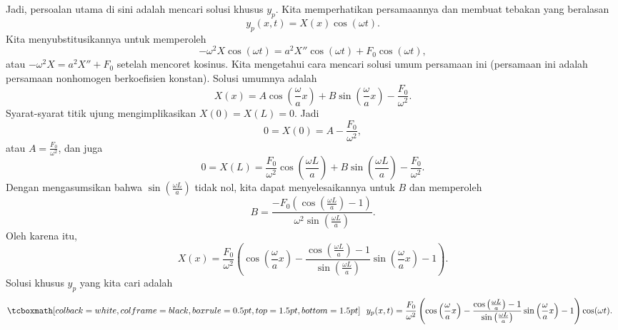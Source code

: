 Jadi, persoalan utama di sini adalah mencari solusi khusus $y_p$.
Kita memperhatikan persamaannya dan membuat tebakan yang beralasan
\begin{equation*}
y_p(x,t) = X(x) \cos (\omega t) .
\end{equation*}
Kita menyubstitusikannya untuk memperoleh
\begin{equation*}
-\omega^2 X \cos ( \omega t) = a^2 X'' \cos ( \omega t) +
F_0 \cos ( \omega t ) ,
\end{equation*}
atau
$-\omega^2 X = a^2 X'' + F_0$ setelah mencoret kosinus.
Kita mengetahui cara mencari solusi umum persamaan ini (persamaan ini adalah
persamaan nonhomogen berkoefisien konstan).
Solusi umumnya adalah
\begin{equation*}
X(x) = A \cos \left( \frac{\omega}{a} x \right)
+ B \sin \left( \frac{\omega}{a} x \right) -
\frac{F_0}{\omega^2} .
\end{equation*}
Syarat-syarat titik ujung mengimplikasikan $X(0) = X(L) = 0$.  Jadi
\begin{equation*}
0 = X(0) = A - \frac{F_0}{\omega^2} ,
\end{equation*}
atau $A = \frac{F_0}{\omega^2}$, dan juga
\begin{equation*}
0 = X(L)
= \frac{F_0}{\omega^2} \cos \left( \frac{\omega L}{a} \right)
+ B \sin \left( \frac{\omega L}{a} \right) -
\frac{F_0}{\omega^2} .
\end{equation*}
Dengan mengasumsikan bahwa $\sin ( \frac{\omega L}{a} )$ tidak nol, kita dapat menyelesaikannya untuk $B$ dan
memperoleh
\begin{equation} \label{natfreq:Beq}
B = 
\frac{-F_0 \left( \cos \left( \frac{\omega L}{a} \right) - 1 \right)}%
{\omega^2 \sin \left( \frac{\omega L}{a} \right)}.
\end{equation}
Oleh karena itu,
\begin{equation*}
X(x) =
\frac{F_0}{\omega^2} \left(
\cos \left(  \frac{\omega}{a} x \right) -
\frac{\cos \left( \frac{\omega L}{a} \right) - 1}%
{\sin \left( \frac{\omega L}{a} \right)}
\sin \left( \frac{\omega}{a} x \right)
- 1
\right) .
\end{equation*}
Solusi khusus $y_p$ yang kita cari adalah
\begin{equation*}
\mybxbg{~~
y_p(x,t) =
\frac{F_0}{\omega^2} \left(
\cos \left( \frac{\omega}{a} x \right) -
\frac{\cos \left( \frac{\omega L}{a} \right) - 1}%
{\sin \left( \frac{\omega L}{a}\right)}
\sin \left( \frac{\omega}{a} x \right)
-1
\right)
\cos ( \omega t) .
~~}
\end{equation*}

